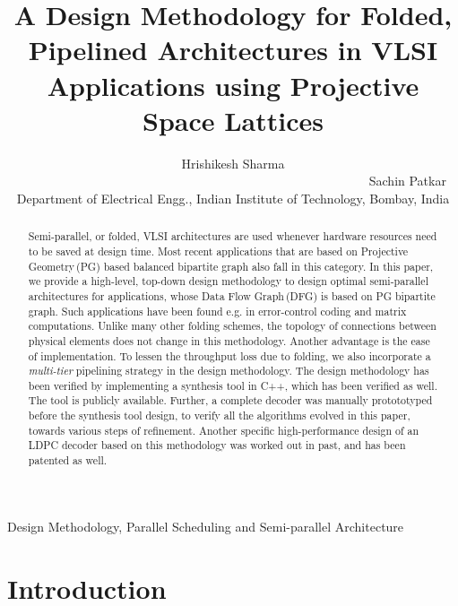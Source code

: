 \documentclass[12pt]{article}
\begin{document}
\title{A Design Methodology for Folded, Pipelined Architectures
in VLSI Applications using Projective Space Lattices}

\author{ \normalsize{Hrishikesh Sharma} ~~~~~~~~~~~~~~~~~~~~~~~~~~~~~~~~~~~~~~~~~~~~~~~~~~~~~~~ \normalsize{Sachin Patkar} \\
\normalsize{Department of Electrical Engg., Indian Institute of
Technology, Bombay, India}
}

\maketitle

\begin{abstract}
Semi-parallel, or folded, VLSI architectures are used whenever hardware
resources need to be saved at design time. Most recent applications that
are based on Projective Geometry\,(PG) based balanced bipartite graph also
fall in this category. In this paper, we provide a high-level, top-down
design methodology to design optimal semi-parallel architectures for
applications, whose Data Flow Graph\,(DFG) is based on PG bipartite graph.
Such applications have been found e.g. in error-control coding and matrix
computations. Unlike many other folding schemes, the topology of
connections between physical elements does not change in this methodology.
Another advantage is the ease of implementation. To lessen the throughput
loss due to folding, we also incorporate a \textit{multi-tier}
pipelining strategy in the design methodology. The design
methodology has been verified by implementing a synthesis tool in C++,
which has been verified as well. The tool is publicly available.
Further, a complete decoder was manually protototyped before the synthesis tool design, to
verify all the algorithms evolved in this paper, towards various steps of
refinement. Another
specific high-performance design of an LDPC decoder based on this
methodology was worked out in past, and has been patented as well.
\end{abstract}

\begin{keywords}
Design Methodology, Parallel Scheduling and Semi-parallel Architecture
\end{keywords}

\section{Introduction}
\label{intro_sec}
\end{document}
